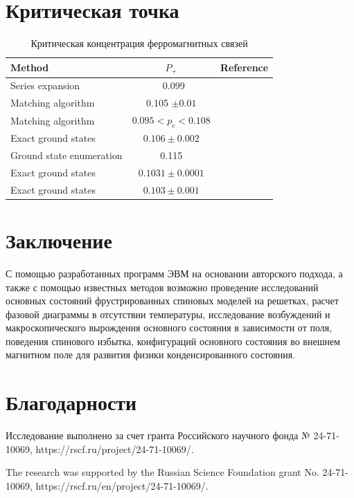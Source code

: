 \documentclass[utf8, babel, sor, jor, amsmath, amssymb, reprint]{elsarticle} %
\begin{document}
\section{Критическая точка}


\begin{table}[!h]
	\begin{tabular}{|l|c|l|}
		\hline
		Method                                   & $P_{+}$                                       & Reference                                           
		\\ \hline
		Series expansion 								& ~0.099                                  & \cite{PhysRevB.19.260}    \\ \hline
	     Matching algorithm                            & 
	     0.105 $\pm 0.01$                                        & \cite{H_Freund_1989} \\ \hline
		Matching algorithm                      & 
		$0.095<p_c<0.108$                                          & \cite{BENDISCH1994139}      \\ \hline
		Exact ground states                       & 
		$0.106 \pm 0.002$                               & \cite{N.Kawashima_1997}     \\ \hline
		Ground state enumeration                             & 0.115                                          & \cite{PhysRevE.58.1502} \\ \hline
    	Exact ground states        & 
		$0.1031\pm0.0001$                                          & \cite{WANG200331}   \\ \hline
		Exact ground states   & $0.103\pm0.001$                                       & \cite{amoruso2004domain} 
		    \\ \hline
			
	\end{tabular}
	\label{tab:Egs}
	\caption{Критическая концентрация ферромагнитных связей}
\end{table}


\section{Заключение}

С помощью разработанных программ ЭВМ на основании авторского подхода, а также с помощью известных методов возможно проведение исследований основных состояний фрустрированных спиновых моделей на решетках, расчет фазовой диаграммы в отсутствии температуры, исследование возбуждений и макроскопического вырождения основного состояния в зависимости от поля, поведения спинового избытка, конфигураций основного состояния во внешнем магнитном поле для развития физики конденсированного состояния.


\section{Благодарности}

Исследование выполнено за счет гранта Российского научного фонда № 24-71-10069, https://rscf.ru/project/24-71-10069/.

The research was supported by the Russian Science Foundation grant No. 24-71-10069, https://rscf.ru/en/project/24-71-10069/.


\end{document}
